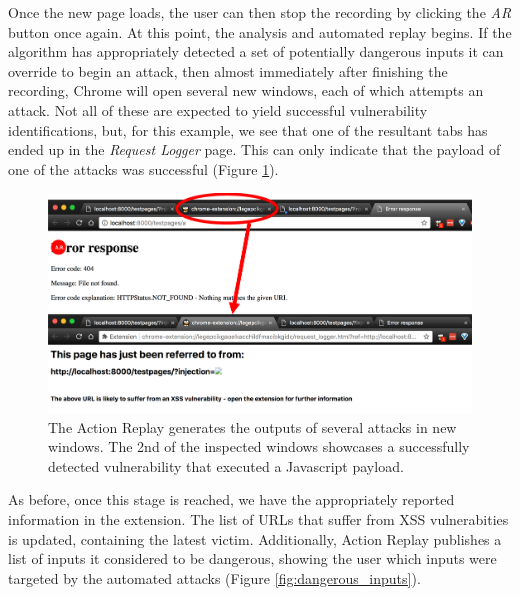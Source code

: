 Once the new page loads, the user can then stop the recording by clicking the \textit{AR} button once again. At this point, the analysis and automated replay begins. If the algorithm has appropriately detected a set of potentially dangerous inputs it can override to begin an attack, then almost immediately after finishing the recording, Chrome will open several new windows, each of which attempts an attack. Not all of these are expected to yield successful vulnerability identifications, but, for this example, we see that one of the resultant tabs has ended up in the \textit{Request Logger} page. This can only indicate that the payload of one of the attacks was successful (Figure \ref{fig:successful_replay}). \\ 


\begin{figure}[h!]
	\centering
	\includegraphics[width=\textwidth]{images/successful_replay.png}
	\caption{The Action Replay generates the outputs of several attacks in new windows. The 2nd of the inspected windows showcases a successfully detected vulnerability that executed a Javascript payload.}
	\label{fig:successful_replay}
\end{figure}

As before, once this stage is reached, we have the appropriately reported information in the extension. The list of URLs that suffer from XSS vulnerabities is updated, containing the latest victim. Additionally, Action Replay publishes a list of inputs it considered to be dangerous, showing the user which inputs were targeted by the automated attacks (Figure \ref{fig:dangerous_inputs}).  \\

